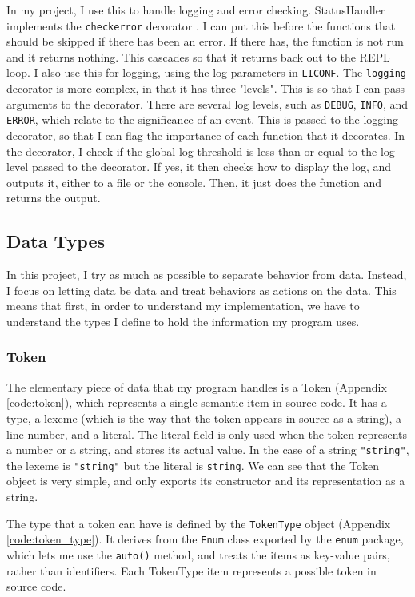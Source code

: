 \documentclass[a4paper, 11pt]{report}
\begin{document}
{{In my project, I use this to handle logging and error checking. StatusHandler implements the \verb|checkerror| decorator . I can put this before the functions that should be skipped if there has been an error. If there has, the function is not run and it returns nothing. This cascades so that it returns back out to the REPL loop. I also use this for logging, using the log parameters in \verb|LICONF|. The \verb|logging| decorator  is more complex, in that it has three "levels". This is so that I can pass arguments to the decorator. There are several log levels, such as \verb|DEBUG|, \verb|INFO|, and \verb|ERROR|, which relate to the significance of an event. This is passed to the logging decorator, so that I can flag the importance of each function that it decorates. In the decorator, I check if the global log threshold is less than or equal to the log level passed to the decorator. If yes, it then checks how to display the log, and outputs it, either to a file or the console. Then, it just does the function and returns the output.

\subsection{Data Types}
In this project, I try as much as possible to separate behavior from data. Instead, I focus on letting data be data and treat behaviors as actions on the data. This means that first, in order to understand my implementation, we have to understand the types I define to hold the information my program uses.

\subsubsection{Token}
The elementary piece of data that my program handles is a Token (Appendix \ref{code:token}), which represents a single semantic item in source code. It has a type, a lexeme (which is the way that the token appears in source as a string), a line number, and a literal. The literal field is only used when the token represents a number or a string, and stores its actual value. In the case of a string \verb|"string"|, the lexeme is \verb|"string"| but the literal is \verb|string|. We can see that the Token object is very simple, and only exports its constructor and its representation as a string.

The type that a token can have is defined by the \verb|TokenType| object (Appendix \ref{code:token_type}). It derives from the \verb|Enum| class exported by the \verb|enum| package, which lets me use the \verb|auto()| method, and treats the items as key-value pairs, rather than identifiers. Each TokenType item represents a possible token in source code.

}}
\end{document}
